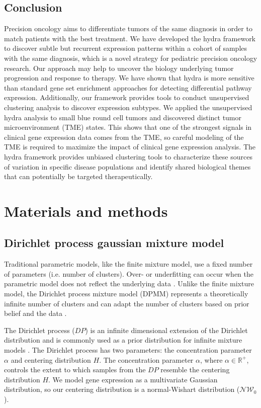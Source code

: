\documentclass[10pt,letterpaper]{article}
\begin{document}
\subsection*{Conclusion}
Precision oncology aims to differentiate tumors of the same diagnosis in order to match patients with the best treatment. We have developed the hydra framework to discover subtle but recurrent expression patterns within a cohort of samples with the same diagnosis, which is a novel strategy for pediatric precision oncology research. Our approach may help to uncover the biology underlying tumor progression and response to therapy. We have shown that hydra is more sensitive than standard gene set enrichment approaches for detecting differential pathway expression. Additionally, our framework provides tools to conduct unsupervised clustering analysis to discover expression subtypes. We applied the unsupervised hydra analysis to small blue round cell tumors and discovered distinct tumor microenvironment (TME) states. This shows that one of the strongest signals in clinical gene expression data comes from the TME, so careful modeling of the TME is required to maximize the impact of clinical gene expression analysis. The hydra framework provides unbiased clustering tools to characterize these sources of variation in specific disease populations and identify shared biological themes that can potentially be targeted therapeutically.

\section*{Materials and methods}
\subsection*{Dirichlet process gaussian mixture model}
Traditional parametric models, like the finite mixture model, use a fixed number of parameters (i.e. number of clusters). Over- or underfitting can occur when the parametric model does not reflect the underlying data \cite{teh2010dirichlet}. Unlike the finite mixture model, the Dirichlet process mixture model (DPMM) represents a theoretically infinite number of clusters and can adapt the number of clusters based on prior belief and the data \cite{gelmanBayesianDataAnalysis2013, antoniakMixturesDirichletProcesses1974, teh2010dirichlet}.

The Dirichlet process ($DP$) is an infinite dimensional extension of the Dirichlet distribution \cite{fergusonBayesianAnalysisNonparametric1973} and is commonly used as a prior distribution for infinite mixture models \cite{muller2004nonparametric, gorurDirichletProcessGaussian2010}. The Dirichlet process has two parameters: the concentration parameter $\alpha$ and centering distribution $H$. The concentration parameter $\alpha$, where $\alpha \in \mathbb{R}^+$, controls the extent to which samples from the $DP$ resemble the centering distribution $H$. We model gene expression as a multivariate Gaussian distribution, so our centering distribution is a normal-Wishart distribution ($\mathcal{NW}_0$).
\end{document}
